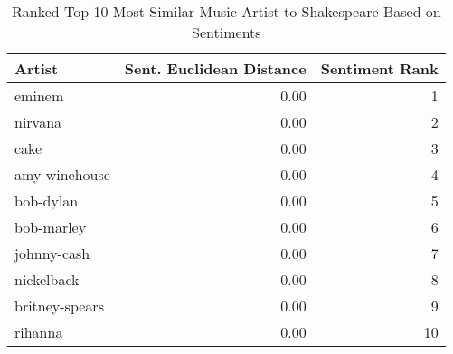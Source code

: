 \begin{table}[ht]
\centering
\begin{tabular}{lrr}
  \hline
Artist & Sent. Euclidean Distance & Sentiment Rank \\ 
  \hline
eminem & 0.00 &   1 \\ 
  nirvana & 0.00 &   2 \\ 
  cake & 0.00 &   3 \\ 
  amy-winehouse & 0.00 &   4 \\ 
  bob-dylan & 0.00 &   5 \\ 
  bob-marley & 0.00 &   6 \\ 
  johnny-cash & 0.00 &   7 \\ 
  nickelback & 0.00 &   8 \\ 
  britney-spears & 0.00 &   9 \\ 
  rihanna & 0.00 &  10 \\ 
   \hline
\end{tabular}
\caption{Ranked Top 10 Most Similar Music Artist to Shakespeare Based on Sentiments} 
\label{tab:wordranktable}
\end{table}

